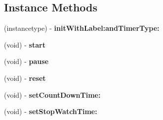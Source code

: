 \subsection*{Instance Methods}
\begin{DoxyCompactItemize}
\item 
\mbox{\label{interface_w_b___stopwatch_a1587af728c07f287dcda654cf827e232}} 
(instancetype) -\/ {\bfseries init\+With\+Label\+:and\+Timer\+Type\+:}
\item 
\mbox{\label{interface_w_b___stopwatch_ace5d097dc673cd4f4011f395c544306f}} 
(void) -\/ {\bfseries start}
\item 
\mbox{\label{interface_w_b___stopwatch_a4df74ae002fdba5030232ec2dd86a1bf}} 
(void) -\/ {\bfseries pause}
\item 
\mbox{\label{interface_w_b___stopwatch_acbd8dc79626337afc123582955626d2c}} 
(void) -\/ {\bfseries reset}
\item 
\mbox{\label{interface_w_b___stopwatch_ade3238c8d795d31bba664f0fd339a96b}} 
(void) -\/ {\bfseries set\+Count\+Down\+Time\+:}
\item 
\mbox{\label{interface_w_b___stopwatch_a508c14e1d6c2efb45084b5c2763de87a}} 
(void) -\/ {\bfseries set\+Stop\+Watch\+Time\+:}
\end{DoxyCompactItemize}
